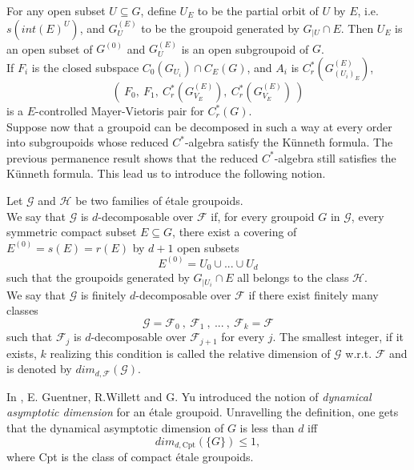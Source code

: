 For any open subset $U\subseteq G$, define $U_E$ to be the partial orbit of $U$ by $E$, i.e. $s(int(E)^U)$, and $G^{(E)}_U$ to be the groupoid generated by $G_{|U}\cap E$. Then $U_E$ is an open subset of $G^{(0)}$ and $G^{(E)}_U$ is an open subgroupoid of $G$.\\
 
If $F_i$ is the closed subspace $C_0(G_{U_i})\cap C_E(G)$, and $A_i$ is $C_r^*(G_{(U_i)_E}^{(E)})$, 
\[\left( \ F_0 , \ F_1 , \ C_r^*(G_{V_E}^{(E)}) , \ C_r^*(G_{V_E}^{(E)}) \  \right)\]
is a $E$-controlled Mayer-Vietoris pair for $C_r^*(G)$. \\
Suppose now that a groupoid can be decomposed in such a way at every order into subgroupoids whose reduced $C^*$-algebra satisfy the Künneth formula. The previous permanence result shows that the reduced $C^*$-algebra still satisfies the Künneth formula. This lead us to introduce the following notion.

\begin{definition}
Let $\mathcal G$ and $\mathcal H$ be two families of \'etale groupoids. \\

We say that $\mathcal G$ is $d$-decomposable over $\mathcal F$ if, for every groupoid $G$ in $\mathcal G$, every symmetric compact subset $E\subseteq G$, there exist a covering of $E^{(0)} = s(E)=r(E)$ by $d+1$ open subsets 
\[E^{(0)} = U_0 \cup ... \cup U_d \] such that the groupoids generated by $G_{|U_i} \cap E$ all belongs to the class $\mathcal H$.\\

We say that $\mathcal G$ is finitely $d$-decomposable over $\mathcal F$ if there exist finitely many classes 
\[\mathcal G= \mathcal F_0 \ , \ \mathcal F_1 \ , \ ... \ , \ \mathcal F_k = \mathcal F \] 
such that $\mathcal F_j$ is $d$-decomposable over $\mathcal F_{j+1}$ for every $j$. The smallest integer, if it exists, $k$ realizing this condition is called the relative dimension of $\mathcal G$ w.r.t. $\mathcal F$ and is denoted by $dim_{d,\mathcal F}(\mathcal G)$.  
\end{definition}

In \cite{GWY}, E. Guentner, R.Willett and G. Yu introduced the notion of \textit{dynamical asymptotic dimension} for an \'etale groupoid. Unravelling the definition, one gets that the dynamical asymptotic dimension of $G$ is less than $d$ iff \[dim_{d,\text{Cpt}} (\{G\}) \leq 1,\]
where Cpt is the class of compact \'etale groupoids.\\

